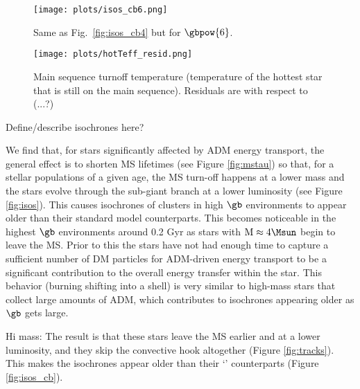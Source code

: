 \begin{figure*}
  \centering
  \texttt{[image: plots/isos\_cb6.png]}
  \caption{Same as Fig.~\ref{fig:isos_cb4} but for $\gbpow{6}$.
  }
  \label{fig:isos_cb6}
\end{figure*}


\begin{figure*}
    \centering
    \texttt{[image: plots/hotTeff\_resid.png]}
    \caption{
    Main sequence turnoff temperature (temperature of the hottest star that is still on the main sequence). Residuals are with respect to (...?)
    }
    \label{fig:hotTeff}

\end{figure*}


Define/describe isochrones here?

We find that, for stars significantly affected by ADM energy transport, the general effect is to shorten MS lifetimes (see Figure \ref{fig:mstau}) so that, for a stellar populations of a given age, the MS turn-off happens at a lower mass and the stars evolve through the sub-giant branch at a lower luminosity (see Figure \ref{fig:isos}). This causes isochrones of clusters in high $\gb$ environments to appear older than their standard model counterparts. This becomes noticeable in the highest $\gb$ environments around 0.2 Gyr as stars with $\rm{M} \approx 4 \Msun$ begin to leave the MS. Prior to this the stars have not had enough time to capture a sufficient number of DM particles for ADM-driven energy transport to be a significant contribution to the overall energy transfer within the star.  This behavior (burning shifting into a shell) is very similar to high-mass stars that collect large amounts of ADM, which contributes to isochrones appearing older as $\gb$ gets large.

Hi mass: The result is that these stars leave the MS earlier and at a lower luminosity, and they skip the convective hook altogether (Figure \ref{fig:tracks}). This makes the isochrones appear older than their `\nodm' counterparts (Figure \ref{fig:isos_cb}).


